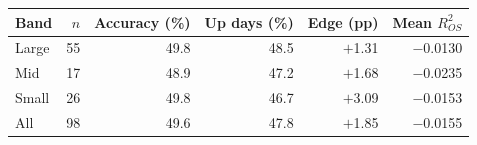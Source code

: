 \begin{tabular}{@{}lrrrrr@{}}
\toprule
Band & $n$ & Accuracy (\%) & Up days (\%) & Edge (pp) & Mean $R^2_{OS}$ \\
\midrule
Large & 55 & 49.8 & 48.5 & $+$1.31 & $-$0.0130 \\
Mid & 17 & 48.9 & 47.2 & $+$1.68 & $-$0.0235 \\
Small & 26 & 49.8 & 46.7 & $+$3.09 & $-$0.0153 \\
\midrule
All & 98 & 49.6 & 47.8 & $+$1.85 & $-$0.0155 \\
\bottomrule
\end{tabular}
